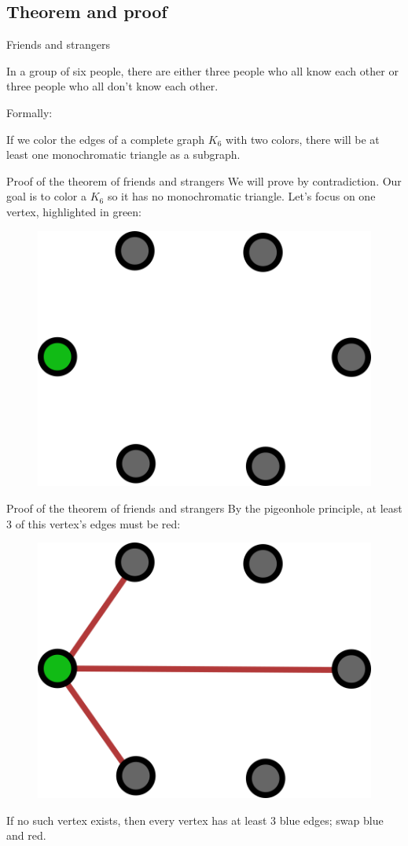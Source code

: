 \documentclass[aspectratio=169]{beamer}
\begin{document}
\subsection{Theorem and proof} %
\begin{frame}{Friends and strangers}
    \begin{theorem}
        In a group of six people, there are either three people who all know each other or three people who all don't know each other.
    \end{theorem} \pause
    \vspace{20pt}
    Formally:
    \begin{theorem}
        If we color the edges of a complete graph $K_6$ with two colors, there will be at least one monochromatic triangle as a subgraph.
    \end{theorem}
\end{frame}

\begin{frame}{Proof of the theorem of friends and strangers}
    We will prove by contradiction. Our goal is to color a $K_6$ so it has no monochromatic triangle. Let's focus on one vertex, highlighted in green:
    \begin{figure}
        \centering
        \includegraphics[width=0.5\columnwidth]{images/step1.png}
    \end{figure}
\end{frame}

\begin{frame}{Proof of the theorem of friends and strangers}
    By the pigeonhole principle, at least 3 of this vertex's edges must be red:
    \begin{figure}
        \centering
        \includegraphics[width=0.5\columnwidth]{images/step2.png}
    \end{figure}
    If no such vertex exists, then every vertex has at least 3 blue edges; swap blue and red.
\end{frame}
\end{document}
